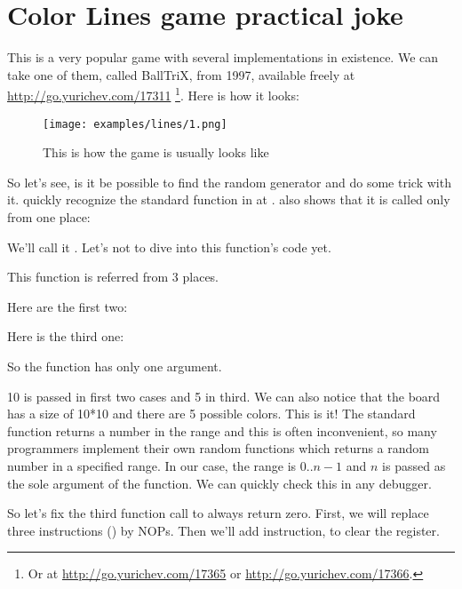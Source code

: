 ﻿\clearpage
\section{Color Lines game practical joke}
\label{chap:color_lines}

This is a very popular game with several implementations in existence.
We can take one of them, called BallTriX, from 1997, available freely at \url{http://go.yurichev.com/17311}
\footnote{Or at \url{http://go.yurichev.com/17365} or \url{http://go.yurichev.com/17366}.}.
Here is how it looks:%

\begin{figure}[H]
\centering
\texttt{[image: examples/lines/1.png]}
\caption{This is how the game is usually looks like}
\label{fig:lines_1}
\end{figure}

\clearpage
{}

So let's see, is it be possible to find the random generator and do some trick with it.
\IDA quickly recognize the standard  function in  at .
\IDA also shows that it is called only from one place:



We'll call it .
Let's not to dive into this function's code yet.

This function is referred from 3 places.

Here are the first two:



Here is the third one:



So the function has only one argument.

10 is passed in first two cases and 5 in third.
We can also notice 
that the board has a size of 10*10 and there are 5 possible colors.
This is it!
The standard  function returns 
a number in the  range and this is often inconvenient,
so many programmers implement their own random functions which returns a random number in a specified range.
In our case, the range is $0..n-1$ and $n$ is passed as the sole argument of the function.
We can quickly check this in any debugger.

So let's fix the third function call to always return zero.
First, we will replace three instructions () 
by \ac{NOP}s.
Then we'll add  instruction, 
to clear the \EAX register.

